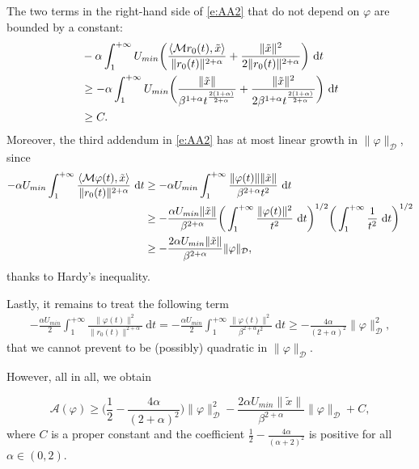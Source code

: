\documentclass[a4paper,10pt]{amsart}
\newcommand{\ud}{\mathrm{d}}
\theoremstyle{plain}
\theoremstyle{definition}
\numberwithin{equation}{section}
\numberwithin{thm}{section}
\begin{document}
The two terms in the right-hand side of \eqref{e:AA2} that do not depend on $\varphi$ are bounded by a constant:
\[
\begin{split}
&-\alpha\int_{1}^{+\infty} U_{min}\bigg(  \frac{\langle \mathcal{M} r_0(t),\Tilde{x}\rangle}{\|r_0(t)\|^{2+\alpha}} + \frac{\|\Tilde{x}\|^2}{2\|r_0(t)\|^{2+\alpha}}\bigg)\ \ud t\\
&\ge -\alpha\int_{1}^{+\infty} U_{min}\bigg(\frac{\|\Tilde{x}\|}{\beta^{1+\alpha} t^{\frac{2(1+\alpha)}{2+\alpha}}} + \frac{\|\Tilde{x}\|^2}{2\beta^{1+\alpha} t^{\frac{2(1+\alpha)}{2+\alpha}}}\bigg)\ \ud t \\
&\ge C.
\end{split}
\]
Moreover, the third addendum in \eqref{e:AA2} has at most linear growth in $\|\varphi\|_{\mathcal{D}}$, since 
\[
\begin{split}
-\alpha U_{min}\int_{1}^{+\infty} \frac{\langle \mathcal{M}\varphi(t),\Tilde{x}\rangle}{\|r_0(t)\|^{2+\alpha}}\ \ud t &\ge - \alpha U_{min}\int_{1}^{+\infty} \frac{\|\varphi(t)\|\|\Tilde{x}\|}{\beta^{2+\alpha}t^2}\ \ud t \\
&\ge - \frac{\alpha U_{min}\|\tilde x\|}{\beta^{2+\alpha}} \bigg(\int_{1}^{+\infty} \frac{\|\varphi(t)\|^2}{t^2}\ \ud t \bigg)^{1/2}\bigg(\int_{1}^{+\infty} \frac{1}{t^2}\ \ud t\bigg)^{1/2} \\
& \ge - \frac{2\alpha U_{min}\|\tilde x\|}{\beta^{2+\alpha}} \|\varphi\|_\mathcal{D},
\end{split}
\]
thanks to Hardy's inequality.

Lastly, it remains to treat the following term
\[
\begin{split}
    -\frac{\alpha U_{min}}{2}\int_{1}^{+\infty} \frac{\|\varphi(t)\|^2}{\|r_0(t)\|^{2+\alpha}}\ \ud t = -\frac{\alpha U_{min}}{2}\int_{1}^{+\infty} \frac{\|\varphi(t)\|^2}{\beta^{2+\alpha}t^2}\ \ud t \ge -\frac{4\alpha}{(2+\alpha)^2}\|\varphi\|_\mathcal{D}^2,
\end{split}
\]
that we cannot prevent to be (possibly) quadratic in $\|\varphi\|_{\mathcal{D}}$. 

However, all in all, we obtain


\[
\mathcal{A}(\varphi) \ge \bigg(\frac{1}{2}-\frac{4\alpha}{(2+\alpha)^2}\bigg)\|\varphi\|_\mathcal{D}^2 -\frac{2\alpha U_{min}\|\tilde x\|}{\beta^{2+\alpha}}\|\varphi\|_\mathcal{D} + C,
\]
where $C$ is a proper constant and the coefficient $\frac{1}{2}-\frac{4\alpha}{(\alpha+2)^2}$ is positive for all $\alpha\in(0,2)$.
\end{document}
